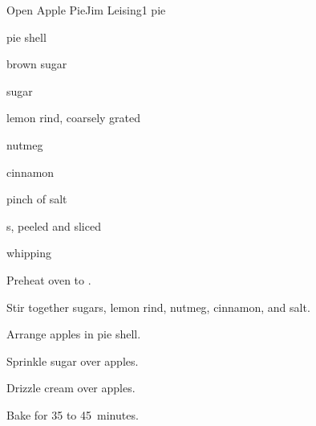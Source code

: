 \begin{recipe}{Open Apple Pie}{Jim Leising}{1 pie}

\begin{ingredients}
\item pie shell
\item \C{\half} brown sugar
\item \C{\half} sugar
\item {} lemon rind, coarsely grated
\item \tp{\half} nutmeg
\item \tp{\half} cinnamon
\item pinch of salt
\item {} s, peeled and sliced
\item \C{\third} whipping 
\end{ingredients}

\begin{directions}
\item Preheat oven to .
\item Stir together sugars, lemon rind, nutmeg, cinnamon, and salt.
\item Arrange apples in pie shell.
\item Sprinkle sugar over apples.
\item Drizzle cream over apples.
\item Bake for 35 to 45~minutes.
\end{directions}

\end{recipe}
